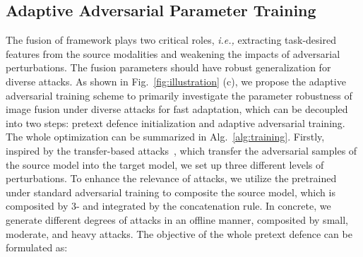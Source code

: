 \documentclass[sigconf]{acmart}
\begin{document}
\subsection{Adaptive Adversarial Parameter Training}


The fusion of framework plays two critical roles, \textit{i.e.,} extracting task-desired features from the source modalities and weakening the impacts of adversarial perturbations. The fusion parameters  should have robust generalization for diverse attacks.
As shown in Fig.~\ref{fig:illustration} (c), we propose the adaptive adversarial training scheme to primarily investigate the parameter robustness of image fusion under diverse attacks for fast adaptation, which can be decoupled into two steps: pretext defence initialization and adaptive adversarial training. 
The whole optimization can be summarized in Alg.~\ref{alg:training}. Firstly, inspired by the transfer-based attacks~\cite{dong2019evading,xie2019improving}, which transfer the adversarial samples of the source model into the target model, we set up three different levels of perturbations. To enhance the relevance  of  attacks, we utilize the pretrained  under standard adversarial training to composite the source model, which is composited by 3- and integrated by the concatenation rule. In concrete, we generate different degrees of attacks in an offline manner, composited by small, moderate, and heavy attacks. The objective of the whole pretext defence can be formulated as:
\end{document}
